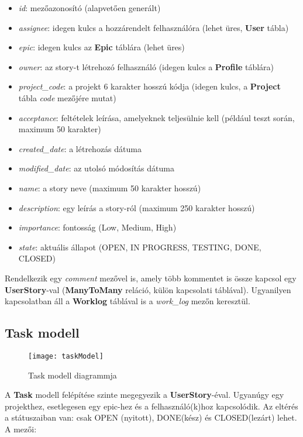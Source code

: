\begin{itemize}
	\item \textit{id}: mezőazonosító (alapvetően generált)
	\item \textit{assignee}: idegen kulcs a hozzárendelt felhasználóra (lehet üres, \textbf{User} tábla)
	\item \textit{epic}: idegen kulcs az \textbf{Epic} táblára (lehet üres)
	\item \textit{owner}: az story-t létrehozó felhasználó (idegen kulcs a \textbf{Profile} táblára)
	\item \textit{project\_code}: a projekt 6 karakter hosszú kódja (idegen kulcs, a \textbf{Project} tábla \textit{code} mezőjére mutat)
	\item \textit{acceptance}: feltételek leírása, amelyeknek teljesülnie kell (például teszt során, maximum 50 karakter)
	\item \textit{created\_date}: a létrehozás dátuma
	\item \textit{modified\_date}: az utolsó módosítás dátuma
	\item \textit{name}: a story neve (maximum 50 karakter hosszú)
	\item \textit{description}: egy leírás a story-ról (maximum 250 karakter hosszú)
	\item \textit{importance}: fontosság (Low, Medium, High)
	\item \textit{state}: aktuális állapot (OPEN, IN PROGRESS, TESTING, DONE, CLOSED)
\end{itemize}

Rendelkezik egy \textit{comment} mezővel is, amely több kommentet is össze kapcsol egy \textbf{UserStory}-val (\textbf{ManyToMany} reláció, külön kapcsolati táblával). Ugyanilyen kapcsolatban áll a \textbf{Worklog} táblával is a \textit{work\_log} mezőn keresztül.

\subsection{Task modell}

\begin{figure}[H]
	\centering
	\texttt{[image: taskModel]}
	\caption{Task modell diagrammja}
	\label{fig:taskmodel}
\end{figure}

A \textbf{Task} modell felépítése szinte megegyezik a \textbf{UserStory}-éval. Ugyanúgy egy projekthez, esetlegesen egy epic-hez és a felhasználó(k)hoz kapcsolódik. Az eltérés a státuszaiban van: csak OPEN (nyitott), DONE(kész) és CLOSED(lezárt) lehet. A mezői:

